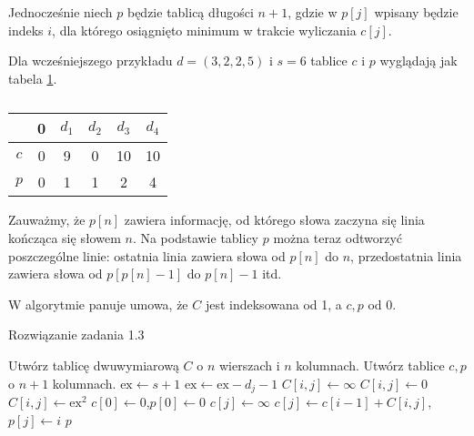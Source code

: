 Jednocześnie niech $p$ będzie tablicą długości $n+1$, gdzie w $p[j]$ wpisany będzie indeks $i$, dla którego osiągnięto minimum w trakcie wyliczania $c[j]$.

Dla wcześniejszego przykładu $d=(3,2,2,5)$ i $s=6$ tablice $c$ i $p$ wyglądają jak tabela \ref{tab_zad13_c}.
\begin{table}[H]
	\centering
	\def\arraystretch{1.25}
	\begin{tabular}{|c|ccccc|}
		\hline & \multicolumn{1}{c|}{0} & \multicolumn{1}{c|}{$d_1$} & \multicolumn{1}{c|}{$d_2$} & \multicolumn{1}{c|}{$d_3$} & \multicolumn{1}{c|}{$d_4$} \\ \hline
		$c$ & 0 & 9 & 0 & 10 & 10 \\ \cline{1-1}
		$p$ & 0 & 1 & 1 & 2 & 4 \\ \cline{1-1}
		\hline
	\end{tabular}
	\caption{}
	\label{tab_zad13_c}
\end{table}

Zauważmy, że $p[n]$ zawiera informację, od którego słowa zaczyna się linia kończąca się słowem $n$. Na podstawie tablicy $p$ można teraz odtworzyć poszczególne linie: ostatnia linia zawiera słowa od $p[n]$ do $n$, przedostatnia linia zawiera słowa od $p[p[n]-1]$ do $p[n]-1$ itd.

W algorytmie panuje umowa, że $C$ jest indeksowana od 1, a $c,p$ od 0.
\begin{algorithm}[H]
	\caption{Rozwiązanie zadania 1.3}\label{Zadanie13}
	\begin{algorithmic}[1]
			\State Utwórz tablicę dwuwymiarową $C$ o $n$ wierszach i $n$ kolumnach.
			\State Utwórz tablice $c,p$ o $n+1$ kolumnach.
				\State $\textrm{ex}\gets s+1$
					\State $\textrm{ex}\gets \textrm{ex} - d_j - 1$
						\State $C[i,j]\gets\infty$
						\State $C[i,j]\gets0$
					\Else
						\State $C[i,j]\gets\textrm{ex}^2$
					\EndIf
				\EndFor
			\EndFor
			\State $c[0]\gets0$,\quad$p[0]\gets0$
				\State $c[j]\gets\infty$
						\State $c[j]\gets c[i-1]+C[i,j]$,\qquad$p[j]\gets i$
					\EndIf
				\EndFor
			\EndFor
			\State \Return $p$
		\EndProcedure
	\end{algorithmic}
\end{algorithm}


